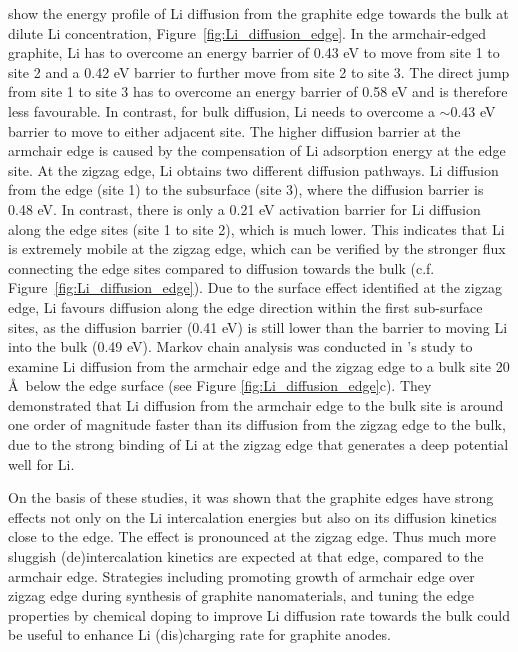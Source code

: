 \documentclass[../main.tex]{subfiles}
\begin{document}
\citeauthor{peng2020lithium} show the energy profile of Li diffusion from the graphite edge towards the bulk at dilute Li concentration, Figure~\ref{fig:Li_diffusion_edge}. In the armchair-edged graphite, Li has to overcome an energy barrier of 0.43 eV to move from site 1 to site 2 and a 0.42 eV barrier to further move from site 2 to site 3. The direct jump from site 1 to site 3 has to overcome an energy barrier of 0.58 eV and is therefore less favourable. In contrast, for bulk diffusion, Li needs to overcome a $\sim$0.43 eV barrier to move to either adjacent site. The higher diffusion barrier at the armchair edge is caused by the compensation of Li adsorption energy at the edge site. At the zigzag edge, Li obtains two different diffusion pathways. Li diffusion from the edge (site 1) to the subsurface (site 3), where the diffusion barrier is 0.48 eV. In contrast, there is only a 0.21 eV activation barrier for Li diffusion along the edge sites (site 1 to site 2), which is much lower. This indicates that Li is extremely mobile at the zigzag edge, which can be verified by the stronger flux connecting the edge sites compared to diffusion towards the bulk (c.f. Figure~\ref{fig:Li_diffusion_edge}). Due to the surface effect identified at the zigzag edge, Li favours diffusion along the edge direction within the first sub-surface sites, as the diffusion barrier (0.41 eV) is still lower than the barrier to moving Li into the bulk (0.49 eV). Markov chain analysis was conducted in \citeauthor{peng2020lithium}'s study to examine Li diffusion from the armchair edge and the zigzag edge to a bulk site 20 \AA \ below the edge surface (see Figure \ref{fig:Li_diffusion_edge}c). They demonstrated that Li diffusion from the armchair edge to the bulk site is around one order of magnitude faster than its diffusion from the zigzag edge to the bulk, due to the strong binding of Li at the zigzag edge that generates a deep potential well for Li.\cite{peng2020lithium}

On the basis of these studies, it was shown that the graphite edges have strong effects not only on the Li intercalation energies but also on its diffusion kinetics close to the edge.\cite{leggesse2016lithium,peng2020lithium} The effect is pronounced at the zigzag edge.\cite{bernardo2015influence,velicky2019electrochemistry,gerischer1985interpretation} Thus much more sluggish (de)intercalation kinetics are expected at that edge, compared to the armchair edge. Strategies including promoting growth of armchair edge over zigzag edge during synthesis of graphite nanomaterials,\cite{bernardo2015influence} and tuning the edge properties by chemical doping to improve Li diffusion rate towards the bulk could be useful to enhance Li (dis)charging rate for graphite anodes.\cite{weydanz1994behavior,way1994effect,endo2001scanning} 
\end{document}
